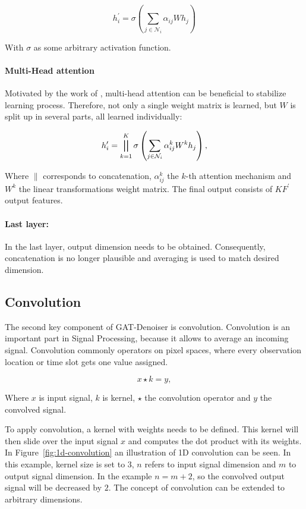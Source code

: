 \begin{equation}
  h_i^{\prime} = \sigma \left( \sum_{j \in \mathcal{N}_i} \alpha_{ij} W h_j \right)
\end{equation}

With $\sigma$ as some arbitrary activation function.

\paragraph{Multi-Head attention}
Motivated by the work of \citet{transformer}, multi-head attention can be beneficial to stabilize learning process.
Therefore, not only a single weight matrix is learned, but $W$ is split up in several parts, 
all learned individually:

\begin{equation}
  h_i^{\prime} = \bigparallel^K_{k=1} \sigma \left(\sum_{j \in \mathcal{N}_i} \alpha_{ij}^k W^k h_j \right),  
\end{equation}

Where $\parallel$ corresponds to concatenation, $\alpha_{ij}^k$ the $k$-th attention mechanism and $W^k$ the linear
transformations weight matrix. The final output consists of $KF^{\prime}$ output features.

\paragraph{Last layer:}
In the last layer, output dimension needs to be obtained. 
Consequently, concatenation is no longer plausible and averaging is used to match desired dimension.

\subsection{Convolution}
The second key component of GAT-Denoiser is convolution.
Convolution is an important part in Signal Processing, because it allows to average an incoming signal.
Convolution commonly operators on pixel spaces, where every observation location or time slot gets one value assigned.

\begin{equation}
  x \star k = y,
\end{equation}

Where $x$ is input signal, $k$ is kernel, $\star$ the convolution operator and $y$ the convolved signal.

To apply convolution, a kernel with weights needs to be defined. 
This kernel will then slide over the input signal $x$ and computes the dot product with its weights.
In Figure~\ref{fig:1d-convolution} an illustration of 1D convolution can be seen. In this example,
kernel size is set to 3, $n$ refers to input signal dimension and $m$ to output signal dimension.
In the example  $ n = m + 2$, so the convolved output signal will be decreased by $2$.
The concept of convolution can be extended to arbitrary dimensions.

